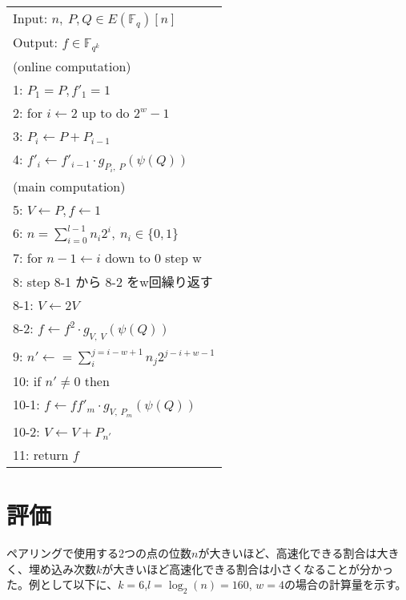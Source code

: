 \documentclass[twocolumn]{jsarticle} %
\begin{document}
\begin{longtable}
 \begin{center}
  \begin{tabular}{|l|}
     \hline
     Input: $n, \ P, Q \in E(\mathbb{F}_q)[n]$ \\
     Output: $f \in \mathbb{F}_{q^k}$  \\
     \hline
     (online computation) \\
     1: \quad $P_1 = P, f'_1=1 $\\
     2: \quad for $i \gets 2$ up to do $2^w -1$\\
     3: \quad \quad $P_i \gets P + P_{i-1} $\\
     4: \quad \quad $f'_i \gets f'_{i-1} \cdot g_{P_i,\ P}(\psi (Q))$\\

     (main computation) \\
     5: \quad $V \gets P, f \gets 1 $\\
     6: \quad $n=\sum^{l - 1}_{i=0} n_i 2^i, \ n_i \in \{0,1\}$\\

     7: \quad for $ n-1 \gets i$ down to 0 step w\\
     8: \quad step 8-1 から 8-2 をw回繰り返す\\
     8-1: \quad \quad $V \gets 2V $\\
     8-2: \quad \quad $f \gets f^2 \cdot g_{V,\ V}(\psi (Q))$\\

     9: \quad $n' \gets =\sum^{j=i-w+1}_{i} n_{j}2^{j-i+w-1} $\\
     10: \quad if $n' \neq 0$ then\\
     10-1: \quad \quad $f \gets ff'_m \cdot g_{V,\ P_m}(\psi (Q))$ \\
     10-2: \quad \quad $V \gets V + P_{n'} $\\
     11: \quad return $f$\\
     \hline
  \end{tabular}
 \end{center}
\end{longtable}

\section{評価}
ペアリングで使用する2つの点の位数$n$が大きいほど、高速化できる割合は大きく、埋め込み次数$k$が大きいほど高速化できる割合は小さくなることが分かった。例として以下に、$k=6$,$l=\log_2(n)=160$, $w=4$の場合の計算量を示す。
\end{document}
